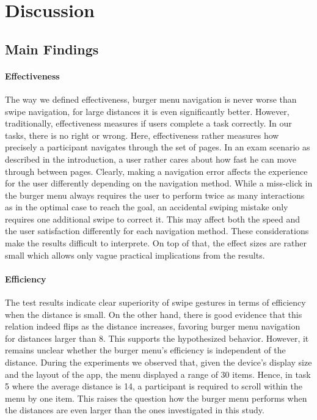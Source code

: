 \documentclass{sig-alternate-05-2015}
\begin{document}
\section{Discussion}
\subsection{Main Findings}
\paragraph{Effectiveness}
The way we defined effectiveness, burger menu navigation is never worse than swipe navigation, for large distances it is even significantly better. However,
traditionally, effectiveness measures if users complete a task correctly. In our tasks, there is no right or wrong. Here, effectiveness rather measures 
how precisely a participant navigates through the set of pages. In an exam scenario as described in the introduction, a user rather cares about
how fast he can move through between pages. Clearly, making a navigation error affects the experience for the user differently depending on the navigation method.
While a miss-click in the burger menu always requires the user to perform twice as many interactions as in the optimal case to reach the goal, an accidental
swiping mistake only requires one additional swipe to correct it. This may affect both the speed and the user satisfaction differently for each navigation method.
These considerations make the results difficult to interprete. On top of that, the effect sizes are rather small which allows only vague practical implications
from the results.
\paragraph{Efficiency}
The test results indicate clear superiority of swipe gestures in terms of efficiency when the distance is small. On the other hand, there is good evidence that
this relation indeed flips as the distance increases, favoring burger menu navigation for distances larger than 8. This supports the hypothesized behavior. However,
it remains unclear whether the burger menu's efficiency is independent of the distance. During the experiments we observed that, given the device's display size and the layout of
the app, the menu displayed a range of 30 items. Hence, in task 5 where the average distance is 14, a participant is required to scroll within the menu by one item.
This raises the question how the burger menu performs when the distances are even larger than the ones investigated in this study.
\end{document}
